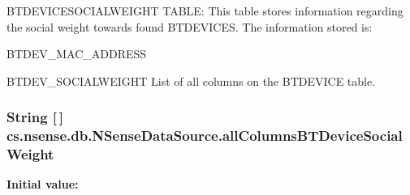 B\-T\-D\-E\-V\-I\-C\-E\-S\-O\-C\-I\-A\-L\-W\-E\-I\-G\-H\-T T\-A\-B\-L\-E\-: This table stores information regarding the social weight towards found B\-T\-D\-E\-V\-I\-C\-E\-S. The information stored is\-:
\begin{DoxyItemize}
\item B\-T\-D\-E\-V\-\_\-\-M\-A\-C\-\_\-\-A\-D\-D\-R\-E\-S\-S
\item B\-T\-D\-E\-V\-\_\-\-S\-O\-C\-I\-A\-L\-W\-E\-I\-G\-H\-T List of all columns on the B\-T\-D\-E\-V\-I\-C\-E table. 
\end{DoxyItemize}\hypertarget{classcs_1_1nsense_1_1db_1_1_n_sense_data_source_a61ec9073eca79d7c07ba05b3fbee4c8f}{
\subsubsection[{all\-Columns\-B\-T\-Device\-Social\-Weight}]{\setlength{\rightskip}{0pt plus 5cm}String \mbox{[}$\,$\mbox{]} cs.\-nsense.\-db.\-N\-Sense\-Data\-Source.\-all\-Columns\-B\-T\-Device\-Social\-Weight\hspace{0.3cm}{\ttfamily [private]}}}\label{classcs_1_1nsense_1_1db_1_1_n_sense_data_source_a61ec9073eca79d7c07ba05b3fbee4c8f}
{\bfseries Initial value\-:}
